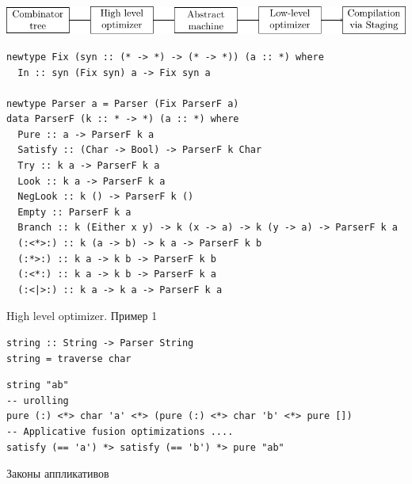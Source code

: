 
\begin{frame}{}
\includegraphics[page=2]{pipeline}
\begin{verbatim}
newtype Fix (syn :: (* -> *) -> (* -> *)) (a :: *) where 
  In :: syn (Fix syn) a -> Fix syn a

newtype Parser a = Parser (Fix ParserF a)
data ParserF (k :: * -> *) (a :: *) where
  Pure :: a -> ParserF k a
  Satisfy :: (Char -> Bool) -> ParserF k Char
  Try :: k a -> ParserF k a
  Look :: k a -> ParserF k a
  NegLook :: k () -> ParserF k ()
  Empty :: ParserF k a
  Branch :: k (Either x y) -> k (x -> a) -> k (y -> a) -> ParserF k a
  (:<*>:) :: k (a -> b) -> k a -> ParserF k b
  (:*>:) :: k a -> k b -> ParserF k b
  (:<*:) :: k a -> k b -> ParserF k a
  (:<|>:) :: k a -> k a -> ParserF k a
\end{verbatim}
\end{frame}




\begin{frame}[fragile]{High level optimizer. Пример 1}

\begin{verbatim}
string :: String -> Parser String
string = traverse char
\end{verbatim}

\begin{verbatim}
string "ab"
-- urolling
pure (:) <*> char 'a' <*> (pure (:) <*> char 'b' <*> pure [])
-- Applicative fusion optimizations ....
satisfy (== 'a') *> satisfy (== 'b') *> pure "ab"
\end{verbatim}

\begin{block}{Законы аппликативов}
\lawApp
\end{block}
\end{frame}






